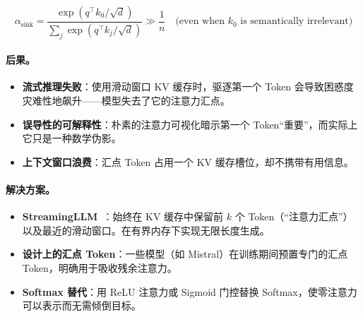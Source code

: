 \[
\alpha_{\text{sink}} = \frac{\exp(q^\top k_0 / \sqrt{d})}{\sum_{j} \exp(q^\top k_j / \sqrt{d})} \gg \frac{1}{n} \quad \text{(even when } k_0 \text{ is semantically irrelevant)}
\]

\paragraph{后果。}
\label{consequences.}

\begin{itemize}
  \item \textbf{流式推理失败}：使用滑动窗口 KV 缓存时，驱逐第一个 Token 会导致困惑度灾难性地飙升——模型失去了它的注意力汇点。
  \item \textbf{误导性的可解释性}：朴素的注意力可视化暗示第一个 Token``重要''，而实际上它只是一种数学伪影。
  \item \textbf{上下文窗口浪费}：汇点 Token 占用一个 KV 缓存槽位，却不携带有用信息。
\end{itemize}

\paragraph{解决方案。}
\label{solutions.}

\begin{itemize}
  \item \textbf{StreamingLLM}~\cite{xiao2024efficient}：始终在 KV 缓存中保留前 $k$ 个 Token（``注意力汇点''）以及最近的滑动窗口。在有界内存下实现无限长度生成。
  \item \textbf{设计上的汇点 Token}：一些模型（如 Mistral）在训练期间预置专门的汇点 Token，明确用于吸收残余注意力。
  \item \textbf{Softmax 替代}：用 ReLU 注意力或 Sigmoid 门控替换 Softmax，使零注意力可以表示而无需倾倒目标。
\end{itemize}

